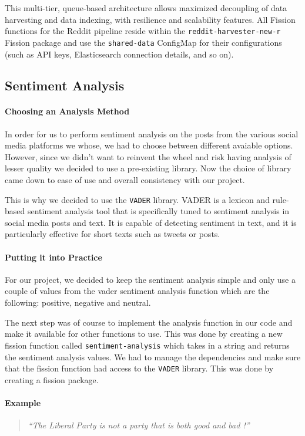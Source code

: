 \documentclass[]{article}
\numberwithin{equation}{section}
\begin{document}
This multi-tier, queue-based architecture allows maximized decoupling of data harvesting and data indexing, with resilience and scalability features. All Fission functions for the Reddit pipeline reside within the \texttt{reddit-harvester-new-r} Fission package and use the \texttt{shared-data} ConfigMap for their configurations (such as API keys, Elasticsearch connection details, and so on).

\subsection*{Sentiment Analysis}

\paragraph*{Choosing an Analysis Method} 
In order for us to perform sentiment analysis on the posts from the various social media platforms we whose, we had to choose between different avaiable options. However, since we didn't want to reinvent the wheel and risk having analysis of lesser quality we decided to use a pre-existing library. Now the choice of library came down to ease of use and overall consistency with our project.

This is why we decided to use the \texttt{VADER} library. VADER is a lexicon and rule-based sentiment analysis tool that is specifically tuned to sentiment analysis in social media posts and text. It is capable of detecting sentiment in text, and it is particularly effective for short texts such as tweets or posts.

\paragraph*{Putting it into Practice}
For our project, we decided to keep the sentiment analysis simple and only use a couple of values from the vader sentiment analysis function which are the following: positive, negative and neutral.

The next step was of course to implement the analysis function in our code and make it available for other functions to use. This was done by creating a new fission function called \texttt{sentiment-analysis} which takes in a string and returns the sentiment analysis values. We had to manage the dependencies and make sure that the fission function had access to the \texttt{VADER} library. This was done by creating a fission package.

\paragraph*{Example}
\begin{quote}
    \textit{``The Liberal Party is not a party that is both good and bad !''}
\end{quote}
\end{document}
